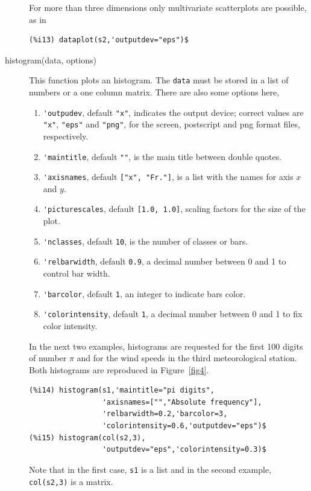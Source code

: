 \documentclass[12pt,a4paper]{article}
\begin{document}
\begin{description}
For more than three dimensions only multivariate scatterplots are possible, as in
\begin{verbatim}
(%i13) dataplot(s2,'outputdev="eps")$
\end{verbatim}


\item[histogram(data, options)] This function plots an histogram. The \verb|data| must be stored in a list of numbers or a one column matrix. There are also some options here,

\begin{enumerate}
\item \verb|'outpudev|, default \verb|"x"|, indicates the output device; correct values are \verb|"x"|, \verb|"eps"| and \verb|"png"|, for the screen, postscript and png format files, respectively.
\item \verb|'maintitle|, default \verb|""|, is the main title between double quotes.
\item \verb|'axisnames|, default \verb|["x", "Fr."]|, is a list with the names for axis $x$ and $y$.
\item \verb|'picturescales|, default \verb|[1.0, 1.0]|, scaling factors for the size of the plot.
\item \verb|'nclasses|, default \verb|10|, is the number of classes or bars.
\item \verb|'relbarwidth|, default \verb|0.9|, a decimal number between 0 and 1 to control bar width.
\item \verb|'barcolor|, default \verb|1|, an integer to indicate bars color.
\item \verb|'colorintensity|, default \verb|1|, a decimal number between 0 and 1 to fix color intensity.
\end{enumerate}

In the next two examples, histograms are requested for the first 100 digits of number $\pi$ and for the wind speeds in the third meteorological station. Both histograms are reproduced in Figure~\ref{fig4}.
\begin{verbatim}
(%i14) histogram(s1,'maintitle="pi digits",
                 'axisnames=["","Absolute frequency"],
                 'relbarwidth=0.2,'barcolor=3,
                 'colorintensity=0.6,'outputdev="eps")$
(%i15) histogram(col(s2,3),
                 'outputdev="eps",'colorintensity=0.3)$
\end{verbatim}
Note that in the first case, \verb|s1| is a list and in the second example, \verb|col(s2,3)| is a matrix.


\end{description}
\end{document}
